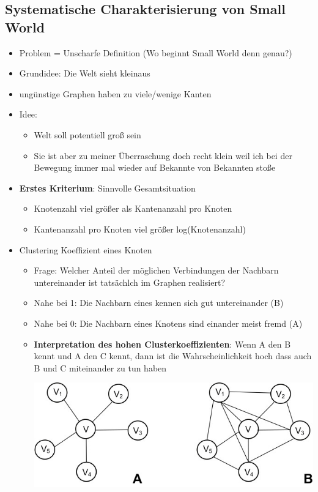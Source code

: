 \documentclass{article} %
\begin{document}
	\subsection{Systematische Charakterisierung von Small World}
	\begin{itemize}
		\item Problem = Unscharfe Definition (Wo beginnt Small World denn genau?)
		\item Grundidee: Die Welt sieht \glqq klein\grqq aus
		\item ungünstige Graphen haben zu viele/wenige Kanten
		\item Idee:
		\begin{itemize}
			\item Welt soll potentiell groß sein 
			\item Sie ist aber zu meiner Überraschung doch recht klein weil ich bei der Bewegung immer mal wieder auf Bekannte von Bekannten stoße
		\end{itemize}
		\item \textbf{Erstes Kriterium}: Sinnvolle Gesamtsituation
		\begin{itemize}
			\item Knotenzahl viel größer als Kantenanzahl pro Knoten
			\item Kantenanzahl pro Knoten viel größer log(Knotenanzahl)
		\end{itemize}
		\item Clustering Koeffizient eines Knoten
		\begin{itemize}
			\item Frage: Welcher Anteil der möglichen Verbindungen der Nachbarn untereinander ist tatsächlch im Graphen realisiert?
			\item Nahe bei 1: Die Nachbarn eines kennen sich gut untereinander (B)
			\item Nahe bei 0: Die Nachbarn eines Knotens sind einander meist fremd (A)
			\item \textbf{Interpretation des hohen Clusterkoeffizienten}: \glqq Wenn A den B kennt und A den C kennt, dann ist die Wahrscheinlichkeit hoch dass auch B und C miteinander zu tun haben
			\begin{center}
				\includegraphics[scale=3]{img/cluster_koeffizient.jpg}

\end{center}
\end{itemize}
\end{itemize}
\end{document}
